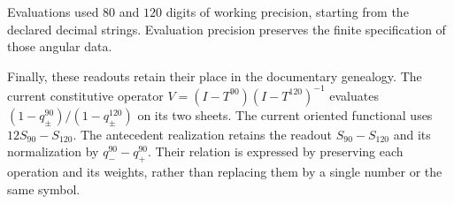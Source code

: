 Evaluations used $80$ and $120$ digits of working precision, starting from
the declared decimal strings. Evaluation precision preserves the finite
specification of those angular data.

Finally, these readouts retain their place in the documentary genealogy.
The current constitutive operator
$V=(I-T^{90})(I-T^{120})^{-1}$ evaluates
$(1-q_\pm^{90})/(1-q_\pm^{120})$ on its two sheets. The current oriented
functional uses $12S_{90}-S_{120}$. The antecedent realization retains the readout
$S_{90}-S_{120}$ and its normalization by $q_-^{90}-q_+^{90}$.
Their relation is expressed by preserving each operation and its weights,
rather than replacing them by a single number or the same symbol.
